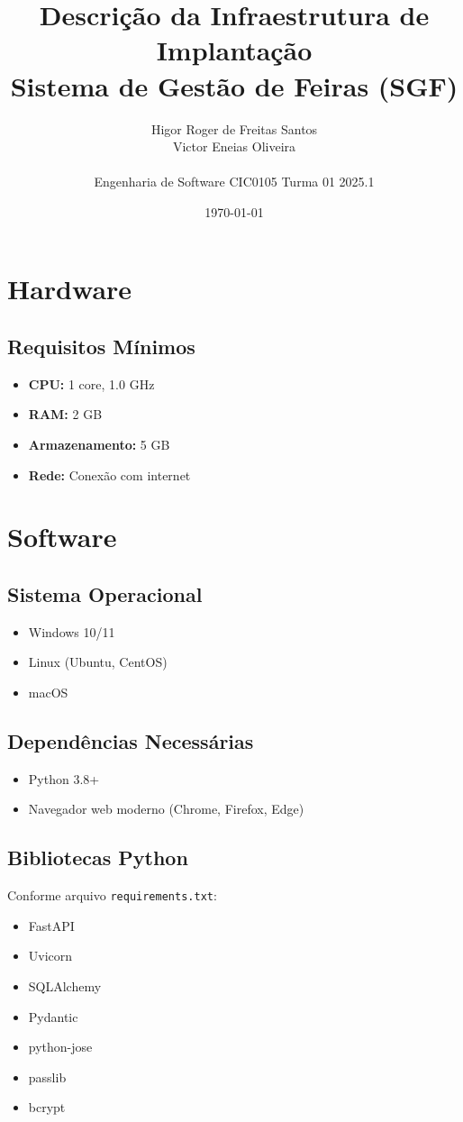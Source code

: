 \documentclass[12pt,a4paper]{article}
\title{\textbf{Descrição da Infraestrutura de Implantação}\\
\large Sistema de Gestão de Feiras (SGF)}
\author{Higor Roger de Freitas Santos \quad 221006440\\
Victor Eneias Oliveira \quad 221038364\\
\\
Engenharia de Software CIC0105 Turma 01 2025.1}
\date{\today}
\begin{document}
\maketitle
\tableofcontents
\newpage

\section{Hardware}

\subsection{Requisitos Mínimos}
\begin{itemize}
    \item \textbf{CPU:} 1 core, 1.0 GHz
    \item \textbf{RAM:} 2 GB
    \item \textbf{Armazenamento:} 5 GB
    \item \textbf{Rede:} Conexão com internet
\end{itemize}

\section{Software}

\subsection{Sistema Operacional}
\begin{itemize}
    \item Windows 10/11
    \item Linux (Ubuntu, CentOS)
    \item macOS
\end{itemize}

\subsection{Dependências Necessárias}
\begin{itemize}
    \item Python 3.8+
    \item Navegador web moderno (Chrome, Firefox, Edge)
\end{itemize}

\subsection{Bibliotecas Python}
Conforme arquivo \texttt{requirements.txt}:
\begin{itemize}
    \item FastAPI
    \item Uvicorn
    \item SQLAlchemy
    \item Pydantic
    \item python-jose
    \item passlib
    \item bcrypt
\end{itemize}
\end{document}
